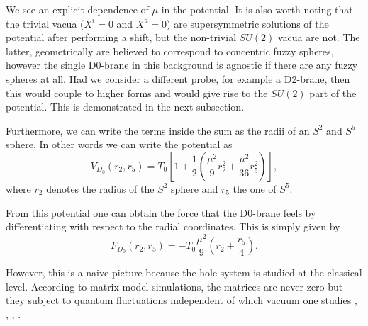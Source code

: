 \documentclass[11pt,english]{article}
\newcommand{\be}{\begin{equation}}
\newcommand{\ee}{\end{equation}}
\numberwithin{equation}{section}
\begin{document}
\noindent
We see an explicit dependence of $\mu$ in the potential. It is also worth noting that the trivial vacua ($X^i=0$ and $X^a=0$) are supersymmetric solutions of the potential after performing a shift, but the non-trivial $SU(2)$ vacua are not. The latter, geometrically are believed to correspond to concentric fuzzy spheres, however the single D0-brane in this background is agnostic if there are any fuzzy spheres at all. Had we consider a different probe, for example a D2-brane, then this would couple to higher forms and would give rise to the $SU(2)$ part of the potential. This is demonstrated in the next subsection. 

\noindent
Furthermore, we can write the terms inside the sum as the radii of an $S^2$ and $S^5$ sphere. In other words we can write the potential as  
\be 
V_{D_0}(r_2,r_5)=T_0\left[1+\frac{1}{2}\left(\frac{\mu^2}{9}r_2^2+\frac{\mu^2}{36}r_5^2\right)\right],
\ee
where $r_2$ denotes the radius of the $S^2$ sphere and $r_5$ the one of $S^5$. 

\noindent
From this potential one can obtain the force that the D0-brane feels by differentiating with respect to the radial coordinates. This is simply given by 
\be 
F_{D_0}(r_2,r_5)=-T_0\frac{\mu^2}{9}\left(r_2+\frac{r_5}{4}\right).
\ee  

\noindent 
However, this is a naive picture because the hole system is studied at the classical level. According to matrix model simulations, the matrices are never zero but they subject to quantum fluctuations independent of which vacuum one studies \cite{Bergner2019}, \cite{Catterall2010}, \cite{Hanada2014}, \cite{Masanori2017}.  
\end{document}
